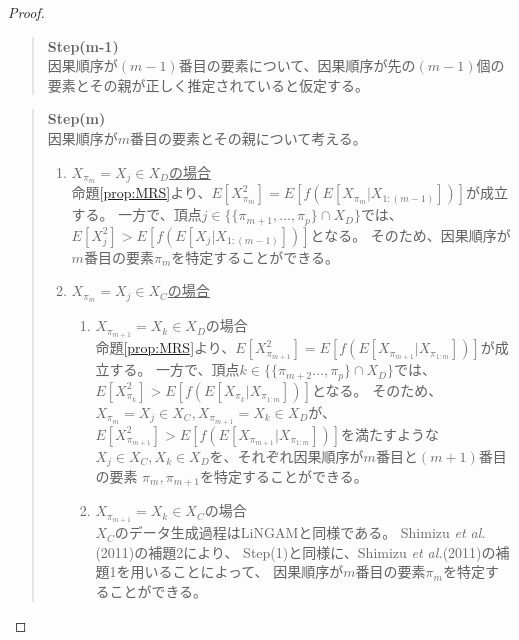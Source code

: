 \begin{proof}
\begin{quote}
\begin{enumerate}[label=(\roman*)]
\begin{enumerate}[label=(ii - \alph*)]
      \end{enumerate}

    \end{enumerate}
  \end{quote}

  \begin{quote}
    \textbf{Step(m-1)} \\
    因果順序が$(m-1)$番目の要素について、因果順序が先の$(m-1)$個の要素とその親が正しく推定されていると仮定する。
  \end{quote}

  \begin{quote}
    \textbf{Step(m)} \\
    因果順序が$m$番目の要素とその親について考える。
    \begin{enumerate}[label=(\roman*)]
      \item
      \underline{$X_{\pi_m} = X_j \in X_D$の場合} \\
      命題\ref{prop:MRS}より、$E[X_{\pi_m}^2] = E[f(E[X_{\pi_m} | X_{1:(m-1)}])]$が成立する。
      一方で、頂点$j \in \{\{ \pi_{m+1}, \dots, \pi_p\} \cap X_D\}$では、
      $E[X_j^2] > E[f(E[X_j | X_{1:(m-1)}])]$となる。
      そのため、因果順序が$m$番目の要素$\pi_m$を特定することができる。

      \item
      \underline{$X_{\pi_m} = X_j \in X_C$の場合}
      \begin{enumerate}[label=(ii - \alph*)]
        \item
        $X_{\pi_{m+1}} = X_k \in X_D$の場合 \\
        命題\ref{prop:MRS}より、$E[X_{\pi_{m+1}}^2] = E[f(E[X_{\pi_{m+1}} | X_{\pi_{1:m}}])]$が成立する。
        一方で、頂点$k \in \{\{ \pi_{m+2} \dots, \pi_{p} \} \cap X_D\}$では、
        $E[X_{\pi_{k}}^2] > E[f(E[X_{\pi_{k}} | X_{\pi_{1:m}}])]$となる。
        そのため、$X_{\pi_m} = X_j \in X_C, X_{\pi_{m+1}} = X_k \in X_D$が、
        $E[X_{\pi_{m+1}}^2] > E[f(E[X_{\pi_{m+1}} | X_{\pi_{1:m}}])]$を満たすような
        $X_j \in X_C, X_k \in X_D$を、それぞれ因果順序が$m$番目と$(m+1)$番目の要素
        $\pi_{m}, \pi_{m+1}$を特定することができる。

        \item
        $X_{\pi_{m+1}} = X_k \in X_C$の場合 \\
        $X_C$のデータ生成過程はLiNGAM\cite{Shimizu2006-yu}と同様である。
        Shimizu \textit{et al.}(2011)\cite{Shimizu2011-pd}の補題2により、
        Step(1)と同様に、Shimizu \textit{et al.}(2011)\cite{Shimizu2011-pd}の補題1を用いることによって、
        因果順序が$m$番目の要素$\pi_m$を特定することができる。


\end{enumerate}
\end{enumerate}
\end{quote}
\end{proof}
